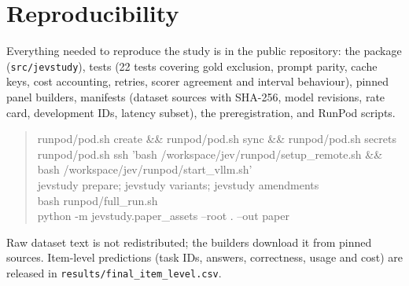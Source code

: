 \section{Reproducibility}
\label{app:repro}
Everything needed to reproduce the study is in the public repository: the package (\texttt{src/jevstudy}), tests (22 tests covering gold exclusion, prompt parity, cache keys, cost accounting, retries, scorer agreement and interval behaviour), pinned panel builders, manifests (dataset sources with SHA-256, model revisions, rate card, development IDs, latency subset), the preregistration, and RunPod scripts.
\begin{quote}\footnotesize\ttfamily
runpod/pod.sh create \&\& runpod/pod.sh sync \&\& runpod/pod.sh secrets\\
runpod/pod.sh ssh 'bash /workspace/jev/runpod/setup\_remote.sh \&\& bash /workspace/jev/runpod/start\_vllm.sh'\\
jevstudy prepare; jevstudy variants; jevstudy amendments\\
bash runpod/full\_run.sh\\
python -m jevstudy.paper\_assets --root . --out paper
\end{quote}
Raw dataset text is not redistributed; the builders download it from pinned sources.
Item-level predictions (task IDs, answers, correctness, usage and cost) are released in \texttt{results/final\_item\_level.csv}.



